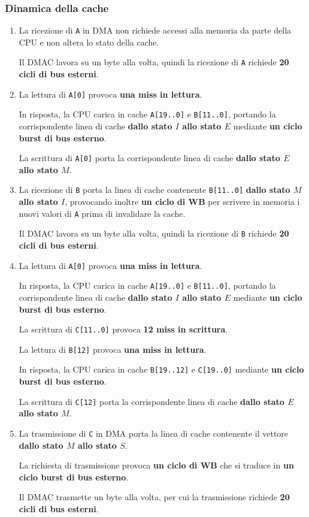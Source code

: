 \documentclass[a4paper]{article}
\begin{document}
\subsubsection{Dinamica della cache}
\begin{enumerate}
\item La ricezione di \texttt{A} in DMA non richiede accessi alla memoria da parte della CPU e non altera lo stato della cache.

Il DMAC lavora su un byte alla volta, quindi la ricezione di \texttt{A} richiede \textbf{20 cicli di bus esterni}.

\item La lettura di \texttt{A[0]} provoca \textbf{una miss in lettura}.

In risposta, la CPU carica in cache \texttt{A[19..0]} e \texttt{B[11..0]}, portando la corrispondente linea di cache \textbf{dallo stato $I$ allo stato $E$} mediante \textbf{un ciclo burst di bus esterno}.

La scrittura di \texttt{A[0]} porta la corrispondente linea di cache \textbf{dallo stato $E$ allo stato $M$}.

\item La ricezione di \texttt{B} porta la linea di cache contenente \texttt{B[11..0]} \textbf{dallo stato $M$ allo stato $I$}, provocando inoltre \textbf{un ciclo di WB} per scrivere in memoria i nuovi valori di \texttt{A} prima di invalidare la cache.

Il DMAC lavora su un byte alla volta, quindi la ricezione di \texttt{B} richiede \textbf{20 cicli di bus esterni}.

\item La lettura di \texttt{A[0]} provoca \textbf{una miss in lettura}.

In risposta, la CPU carica in cache \texttt{A[19..0]} e \texttt{B[11..0]}, portando la corrispondente linea di cache \textbf{dallo stato $I$ allo stato $E$} mediante \textbf{un ciclo burst di bus esterno}.

La scrittura di \texttt{C[11..0]} provoca \textbf{12 miss in scrittura}.

La lettura di \texttt{B[12]} provoca \textbf{una miss in lettura}.

In risposta, la CPU carica in cache \texttt{B[19..12]} e \texttt{C[19..0]} mediante \textbf{un ciclo burst di bus esterno}.

La scrittura di \texttt{C[12]} porta la corrispondente linea di cache \textbf{dallo stato $E$ allo stato $M$}.

\item La trasmissione di \texttt{C} in DMA porta la linea di cache contenente il vettore \textbf{dallo stato $M$ allo stato $S$}.

La richiesta di trasmissione provoca \textbf{un ciclo di WB} che si traduce in \textbf{un ciclo burst di bus esterno}.

Il DMAC trasmette un byte alla volta, per cui la trasmissione richiede \textbf{20 cicli di bus esterni}.

\end{enumerate}
\end{document}
